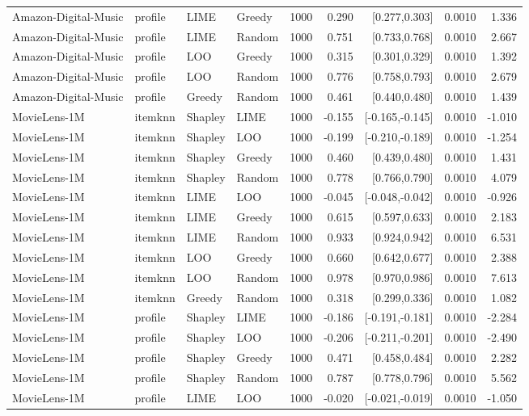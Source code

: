 \begin{table}[!htbp]
\begin{tabular}{@{}llllrrrrr@{}}
Amazon-Digital-Music & profile & LIME & Greedy & 1000 & 0.290 & [0.277,0.303] & 0.0010 & 1.336 \\
Amazon-Digital-Music & profile & LIME & Random & 1000 & 0.751 & [0.733,0.768] & 0.0010 & 2.667 \\
Amazon-Digital-Music & profile & LOO & Greedy & 1000 & 0.315 & [0.301,0.329] & 0.0010 & 1.392 \\
Amazon-Digital-Music & profile & LOO & Random & 1000 & 0.776 & [0.758,0.793] & 0.0010 & 2.679 \\
Amazon-Digital-Music & profile & Greedy & Random & 1000 & 0.461 & [0.440,0.480] & 0.0010 & 1.439 \\
MovieLens-1M & itemknn & Shapley & LIME & 1000 & -0.155 & [-0.165,-0.145] & 0.0010 & -1.010 \\
MovieLens-1M & itemknn & Shapley & LOO & 1000 & -0.199 & [-0.210,-0.189] & 0.0010 & -1.254 \\
MovieLens-1M & itemknn & Shapley & Greedy & 1000 & 0.460 & [0.439,0.480] & 0.0010 & 1.431 \\
MovieLens-1M & itemknn & Shapley & Random & 1000 & 0.778 & [0.766,0.790] & 0.0010 & 4.079 \\
MovieLens-1M & itemknn & LIME & LOO & 1000 & -0.045 & [-0.048,-0.042] & 0.0010 & -0.926 \\
MovieLens-1M & itemknn & LIME & Greedy & 1000 & 0.615 & [0.597,0.633] & 0.0010 & 2.183 \\
MovieLens-1M & itemknn & LIME & Random & 1000 & 0.933 & [0.924,0.942] & 0.0010 & 6.531 \\
MovieLens-1M & itemknn & LOO & Greedy & 1000 & 0.660 & [0.642,0.677] & 0.0010 & 2.388 \\
MovieLens-1M & itemknn & LOO & Random & 1000 & 0.978 & [0.970,0.986] & 0.0010 & 7.613 \\
MovieLens-1M & itemknn & Greedy & Random & 1000 & 0.318 & [0.299,0.336] & 0.0010 & 1.082 \\
MovieLens-1M & profile & Shapley & LIME & 1000 & -0.186 & [-0.191,-0.181] & 0.0010 & -2.284 \\
MovieLens-1M & profile & Shapley & LOO & 1000 & -0.206 & [-0.211,-0.201] & 0.0010 & -2.490 \\
MovieLens-1M & profile & Shapley & Greedy & 1000 & 0.471 & [0.458,0.484] & 0.0010 & 2.282 \\
MovieLens-1M & profile & Shapley & Random & 1000 & 0.787 & [0.778,0.796] & 0.0010 & 5.562 \\
MovieLens-1M & profile & LIME & LOO & 1000 & -0.020 & [-0.021,-0.019] & 0.0010 & -1.050 \\

\end{tabular}
\end{table}
